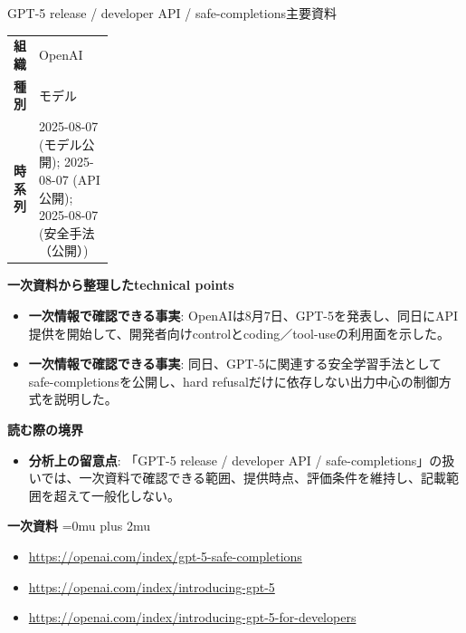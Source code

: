 \begin{technicalnote}{GPT-5 release / developer API / safe-completions}{主要資料}
\begingroup
\begin{tabularx}{\linewidth}{@{}>{\bfseries}p{0.22\linewidth}X@{}}
組織 & OpenAI \\
種別 & モデル \\
時系列 & 2025-08-07 (モデル公開); 2025-08-07 (API公開); 2025-08-07 (安全手法（公開）) \\
\end{tabularx}
\smallskip
{\bfseries 一次資料から整理したtechnical points}
\begin{itemize}[leftmargin=1.5em,itemsep=0.35em]
\item \textbf{一次情報で確認できる事実}: OpenAIは8月7日、GPT-5を発表し、同日にAPI提供を開始して、開発者向けcontrolとcoding／tool-useの利用面を示した。
\item \textbf{一次情報で確認できる事実}: 同日、GPT-5に関連する安全学習手法としてsafe-completionsを公開し、hard refusalだけに依存しない出力中心の制御方式を説明した。
\end{itemize}
\begin{minipage}{\linewidth}
{\bfseries 読む際の境界}
\begin{itemize}[leftmargin=1.5em,itemsep=0.35em]
\item \textbf{分析上の留意点}: 「GPT-5 release / developer API / safe-completions」の扱いでは、一次資料で確認できる範囲、提供時点、評価条件を維持し、記載範囲を超えて一般化しない。
\end{itemize}
\begin{samepage}
{\bfseries 一次資料}
\begingroup\sloppy
\Urlmuskip=0mu plus 2mu\relax
\begin{itemize}[leftmargin=1.5em,itemsep=0.25em]
\item {\scriptsize\url{https://openai.com/index/gpt-5-safe-completions}}
\item {\scriptsize\url{https://openai.com/index/introducing-gpt-5}}
\item {\scriptsize\url{https://openai.com/index/introducing-gpt-5-for-developers}}
\end{itemize}
\endgroup
\end{samepage}
\end{minipage}
\endgroup
\end{technicalnote}
\medskip

